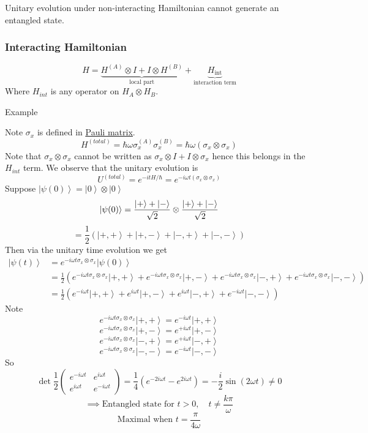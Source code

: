 \documentclass[
]{article}
\let\oldhyperref\hyperref
\renewcommand{\hyperref}[2][]{\oldhyperref[#1]{\underline{#2}}}
\providecommand{\ket}[1]{\left\lvert #1 \right\rangle}
\begin{document}
Unitary evolution under non-interacting Hamiltonian cannot generate an entangled state.


\subsubsection{Interacting Hamiltonian}\label{interacting-hamiltonian}
\[
	H = \underbrace{H^{(A)} \otimes I + I \otimes H^{(B)}}_{\text{local part}} + \underbrace{H_{\text{int}}}_{\text{interaction term}}
\]
Where $H_{int}$ is any operator on $H_A\otimes H_B$.

Example

Note $\sigma_x$ is defined in \hyperref[pauli-matrices]{Pauli matrix}.
\[
	H^{(total)}=\hbar \omega \sigma_x^{(A)}\sigma_x^{(B)}=\hbar\omega (\sigma_x\otimes \sigma_x)
\]
Note that $\sigma_x\otimes \sigma_x$ cannot be written as $\sigma_x\otimes I + I \otimes \sigma_x$ hence this belongs in the $H_{int}$ term.
We observe that the unitary evolution is
\[
	U^{(total)}=e^{-itH/\hbar}=e^{-i\omega t(\sigma_x\otimes \sigma_x)}
\]
Suppose $\ket{\psi(0)} = \ket{0} \otimes \ket{0}$
\[
	\ket{\psi(0)} = \frac{\ket{+} + \ket{-}}{\sqrt{2}} \otimes \frac{\ket{+} + \ket{-}}{\sqrt{2}} \\
\]
\[
	= \frac{1}{2}\left(\ket{+,+} + \ket{+,-} + \ket{-,+} + \ket{-,-}\right)
\]
Then via the unitary time evolution we get
\begin{align*}
	\ket{\psi(t)} & = e^{-i\omega t \sigma_x \otimes \sigma_x}\ket{\psi(0)}                                                                                                                                                                                 \\
	              & = \frac{1}{2}\left(e^{-i\omega t \sigma_x \otimes \sigma_x}\ket{+,+} + e^{-i\omega t \sigma_x \otimes \sigma_x}\ket{+,-} + e^{-i\omega t \sigma_x \otimes \sigma_x}\ket{-,+} + e^{-i\omega t \sigma_x \otimes \sigma_x}\ket{-,-}\right) \\
	              & = \frac{1}{2}\left(e^{-i\omega t}\ket{+,+} + e^{i\omega t}\ket{+,-} + e^{i\omega t}\ket{-,+} + e^{-i\omega t}\ket{-,-}\right)
\end{align*}
Note
\[
	e^{-i\omega t \sigma_x \otimes \sigma_x} \ket{+,+} = e^{-i\omega t} \ket{+,+}
\]
\[
	e^{-i\omega t \sigma_x \otimes \sigma_x} \ket{+,-} = e^{+i\omega t} \ket{+,-}
\]
\[
	e^{-i\omega t \sigma_x \otimes \sigma_x} \ket{-,+} = e^{+i\omega t} \ket{-,+}
\]
\[
	e^{-i\omega t \sigma_x \otimes \sigma_x} \ket{-,-} = e^{-i\omega t} \ket{-,-}
\]
So
\[
	\det \frac{1}{2}\begin{pmatrix} e^{-i\omega t} & e^{i\omega t} \\ e^{i\omega t} & e^{-i\omega t} \end{pmatrix} = \frac{1}{4}\left(e^{-2i\omega t} - e^{2i\omega t}\right) = -\frac{i}{2}\sin(2\omega t) \neq 0
\]
\[
	\implies \text{Entangled state for } t > 0, \quad t \neq \frac{k\pi}{\omega}
\]
\[
	\text{Maximal when } t = \frac{\pi}{4\omega}
\]
\end{document}
